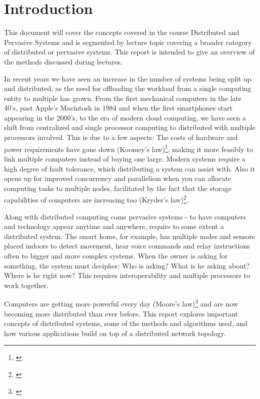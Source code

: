 \chapter{Introduction} \label{ch:introduction}
This document will cover the concepts covered in the course Distributed and Pervasive Systems and is segmented by lecture topic covering a broader category of distributed or pervasive systems. This report is intended to give an overview of the methods discussed during lectures.

In recent years we have seen an increase in the number of systems being split up and distributed, as the need for offloading the workload from a single computing entity to multiple has grown. From the first mechanical computers in the late 40's, past Apple's Macintosh in 1984 and when the first smartphones start appearing in the 2000's, to the era of modern cloud computing, we have seen a shift from centralized and single processor computing to distributed with multiple processors involved. This is due to a few aspects: The costs of hardware and power requirements have gone down (Koomey's law)\footnote{\cite{Koomey2011}}, making it more feasibly to link multiple computers instead of buying one large. Modern systems require a high degree of fault tolerance, which distributing a system can assist with. Also it opens up for improved concurrency and parallelism when you can allocate computing tasks to multiple nodes, facilitated by the fact that the storage capabilities of computers are increasing too (Kryder's law)\footnote{\cite{Walter2005}}.

Along with distributed computing come pervasive systems - to have computers and technology appear anytime and anywhere, require to some extent a distributed system. The smart home, for example, has multiple nodes and sensors placed indoors to detect movement, hear voice commands and relay instructions often to bigger and more complex systems. When the owner is asking for something, the system must decipher: Who is asking? What is he asking about? Where is he right now? This requires interoperability and multiple processors to work together.

Computers are getting more powerful every day (Moore's law)\footnote{\cite{Moore1965}} and are now becoming more distributed than ever before. This report explores important concepts of distributed systems, some of the methods and algorithms used, and how various applications build on top of a distributed network topology.
